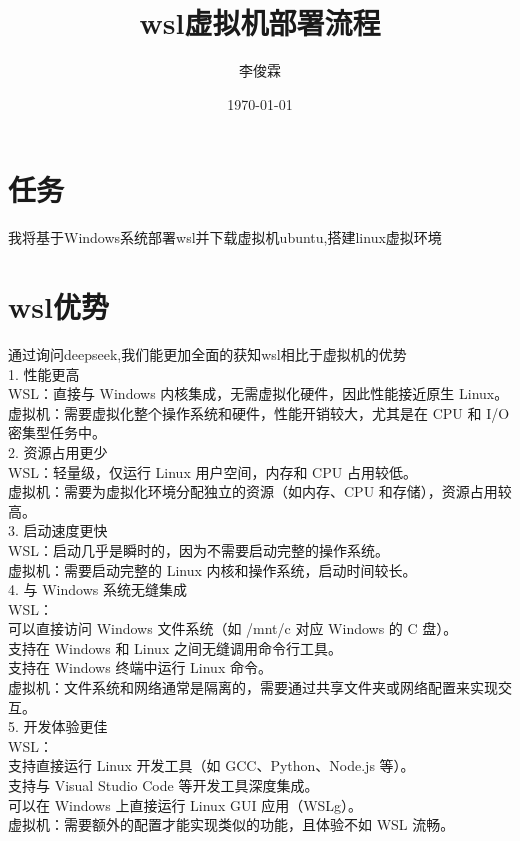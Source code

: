 \documentclass{article}
\title{wsl虚拟机部署流程}
\author{李俊霖}
\date{\today}
\begin{document}
\maketitle

\section{任务}
我将基于Windows系统部署wsl并下载虚拟机ubuntu,搭建linux虚拟环境
\section{wsl优势}
通过询问deepseek,我们能更加全面的获知wsl相比于虚拟机的优势
\\1. 性能更高
\\ \indent  WSL：直接与 Windows 内核集成，无需虚拟化硬件，因此性能接近原生 Linux。
\\ \indent 虚拟机：需要虚拟化整个操作系统和硬件，性能开销较大，尤其是在 CPU 和 I/O 密集型任务中。
\\2. 资源占用更少
\\ \indent WSL：轻量级，仅运行 Linux 用户空间，内存和 CPU 占用较低。
\\ \indent 虚拟机：需要为虚拟化环境分配独立的资源（如内存、CPU 和存储），资源占用较高。
\\3. 启动速度更快
\\ \indent WSL：启动几乎是瞬时的，因为不需要启动完整的操作系统。
\\ \indent 虚拟机：需要启动完整的 Linux 内核和操作系统，启动时间较长。
\\4. 与 Windows 系统无缝集成
\\ \indent WSL：
\\ \indent 可以直接访问 Windows 文件系统（如 /mnt/c 对应 Windows 的 C 盘）。
\\ \indent 支持在 Windows 和 Linux 之间无缝调用命令行工具。
\\ \indent 支持在 Windows 终端中运行 Linux 命令。
\\ \indent 虚拟机：文件系统和网络通常是隔离的，需要通过共享文件夹或网络配置来实现交互。
\\5. 开发体验更佳
\\ \indent WSL：
\\ \indent 支持直接运行 Linux 开发工具（如 GCC、Python、Node.js 等）。
\\ \indent 支持与 Visual Studio Code 等开发工具深度集成。
\\ \indent 可以在 Windows 上直接运行 Linux GUI 应用（WSLg）。
\\ \indent 虚拟机：需要额外的配置才能实现类似的功能，且体验不如 WSL 流畅。
\end{document}
